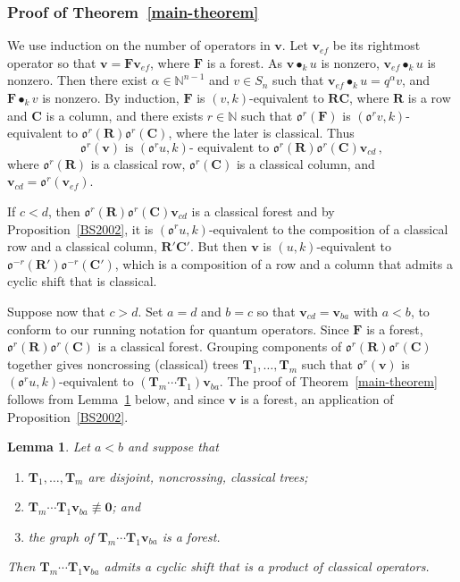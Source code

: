 \documentclass[11pt]{article}
\newtheorem{lemma}[theo]{Lemma}
\theoremstyle{definition}
\numberwithin{equation}{section}
\newcommand{\NN}{{\mathbb N}}
\newcommand{\qv}{{\mathbf v}}
\newcommand{\bzero}{{\mathbf 0}}
\DeclareMathOperator{\kactionop}{{\scriptstyle \bullet}}
\newcommand{\kaction}[1][k]{\kactionop_{#1}}
\newcommand{\ncycle}{\mathfrak o}
\def\R{\mathbf{R}}
\def\C{\mathbf{C}}
\def\F{\mathbf{F}}
\def\T{\mathbf{T}}
\begin{document}
\subsubsection{Proof of Theorem~\ref{main-theorem}}

We use induction on the number of operators in $\qv$.
Let $\qv_{ef}$ be its rightmost operator so that $\qv=\F \qv_{ef}$, where $\F$ is a forest.
As $\qv\kaction u$ is nonzero, $\qv_{ef}\kaction u$ is nonzero.
Then there exist $\alpha\in\NN^{n-1}$ and $v\in S_n$ such that $\qv_{ef}\kaction u=q^\alpha v$, and
$\F\kaction v$ is nonzero.
By induction, $\F$ is $(v,k)$-equivalent to $\R\C$, where $\R$ is a row and $\C$ is a column, and
there exists $r \in \NN$ such that $\ncycle^r(\F)$ is $(\ncycle^r v, k)$-equivalent to $\ncycle^r(\R)\ncycle^r(\C)$, where the later is
classical. 
Thus
\begin{equation*}
    \ncycle^r(\qv) \text{ is } (\ncycle^r u,k)\text{- equivalent to } \ncycle^r(\R)\ncycle^r(\C)\qv_{cd}\,,
\end{equation*}
where $\ncycle^r(\R)$ is a classical row, $\ncycle^r(\C)$ is a classical column, and $\qv_{cd}=\ncycle^r(\qv_{ef})$.

If  $c<d$, then $\ncycle^r(\R)\ncycle^r(\C)\qv_{cd}$ is a classical forest and by
Proposition~\ref{BS2002}, it is $(\ncycle^r u, k)$-equivalent to the composition of a 
classical row and a classical column, $\R' \C'$.
But then $\qv$ is $(u, k)$-equivalent to $\ncycle^{-r}(\R')\ncycle^{-r}(\C')$, which is a composition of a row and a column that admits a cyclic
shift that is classical. 

Suppose now that $c>d$.
Set $a=d$ and $b=c$ so that $\qv_{cd}=\qv_{ba}$ with $a<b$, to conform to our running notation for quantum operators.
Since $\F$ is a forest,  $\ncycle^r(\R)\ncycle^r(\C)$ is a classical forest.
Grouping components of $\ncycle^r(\R)\ncycle^r(\C)$ together gives  noncrossing (classical) trees $\T_1,\dotsc,\T_m$ such that
$\ncycle^r(\qv)$ is $(\ncycle^r u, k)$-equivalent to $(\T_m\dotsb\T_1)\qv_{ba}$.
The proof of Theorem~\ref{main-theorem} follows from Lemma~\ref{cyclic-shift-classical-trees-times-quantum} below,
and since $\qv$ is a forest, an application of Proposition~\ref{BS2002}.

\begin{lemma}
    \label{cyclic-shift-classical-trees-times-quantum}
    Let $a<b$  and suppose that
    \begin{enumerate}[label={{\rm(\roman*)}}]
        \item
            $\T_1, \ldots, \T_m$ are disjoint, noncrossing, classical trees;

        \item
            $\T_m \cdots \T_1 \qv_{ba} \not\equiv \bzero$; and 

        \item
            the graph of $\T_m \cdots \T_1 \qv_{ba}$ is a forest.
    \end{enumerate}
    Then $\T_m \cdots \T_1 \qv_{ba}$
    admits a cyclic shift that is a product of classical operators.
\end{lemma}
\end{document}
